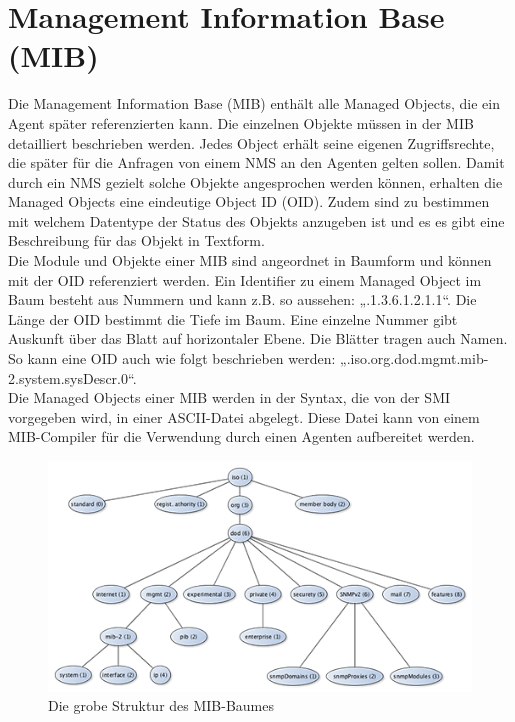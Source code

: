 \documentclass[11pt,a4paper]{article}
\begin{document}
\section{Management Information Base (MIB)}
Die Management Information Base (MIB) enthält alle Managed Objects, die ein Agent später referenzierten kann. Die einzelnen Objekte müssen in der MIB detailliert beschrieben werden. Jedes Object erhält seine eigenen Zugriffsrechte, die später für die Anfragen von einem NMS an den Agenten gelten sollen. Damit durch ein NMS gezielt solche Objekte angesprochen werden können, erhalten die Managed Objects eine eindeutige Object ID (OID). Zudem sind zu bestimmen mit welchem Datentype der Status des Objekts anzugeben ist und es es gibt eine Beschreibung für das Objekt in Textform.\\
Die Module und Objekte einer MIB sind angeordnet in Baumform und können mit der OID referenziert werden. Ein Identifier zu einem Managed Object im Baum besteht aus Nummern und kann z.B. so aussehen: „.1.3.6.1.2.1.1“. Die Länge der OID bestimmt die Tiefe im Baum. Eine einzelne Nummer gibt Auskunft über das Blatt auf horizontaler Ebene. Die Blätter tragen auch Namen. So kann eine OID auch wie folgt beschrieben werden: „.iso.org.dod.mgmt.mib-2.system.sysDescr.0“.\\
Die Managed Objects einer MIB werden in der Syntax, die von der SMI vorgegeben wird, in einer ASCII-Datei abgelegt. Diese Datei kann von einem MIB-Compiler für die Verwendung durch einen Agenten aufbereitet werden.
\\
\begin{figure}[h]
	\centering
	\includegraphics[scale=1]{Bilder/MIB.png}
	\caption{Die grobe Struktur des MIB-Baumes}
\end{figure}
\end{document}
